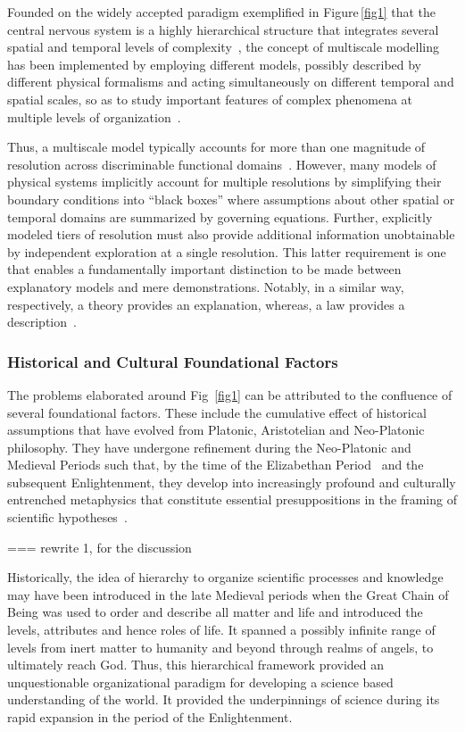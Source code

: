 \documentclass[10pt,letterpaper]{article}
\begin{document}
Founded on the widely accepted paradigm exemplified in Figure\,\ref{fig1} that the central nervous system is a highly hierarchical structure that integrates several spatial and temporal levels of complexity~\cite{bouteiller11}, the concept of multiscale modelling has been implemented by employing different models, possibly described by different physical formalisms and acting simultaneously on different temporal and spatial scales, so as to study important features of complex phenomena at multiple levels of organization~\cite{djurfeldt07}.

Thus, a multiscale model typically accounts for more than one magnitude of resolution across discriminable functional domains~\cite{walpole13}. However, many models of physical systems implicitly account for multiple resolutions by simplifying their boundary conditions into “black boxes” where assumptions about other spatial or temporal domains are summarized by governing equations. Further, explicitly modeled tiers of resolution must also provide additional information unobtainable by independent exploration at a single resolution. This latter requirement is one that enables a fundamentally important distinction to be made between explanatory models and mere demonstrations. Notably, in a similar way, respectively, a theory provides an explanation, whereas, a law provides a description~\cite{schurger22}.

\subsubsection*{Historical and Cultural Foundational Factors}

The problems elaborated around Fig~\ref{fig1} can be attributed to the confluence of several foundational factors. These include the cumulative effect of historical assumptions that have evolved from Platonic, Aristotelian and Neo-Platonic~\cite{parker99} philosophy. They have undergone refinement during the Neo-Platonic and Medieval Periods such that, by the time of the Elizabethan Period~\cite{tillyard17} and the subsequent Enlightenment, they develop into increasingly profound and culturally entrenched metaphysics that constitute essential presuppositions in the framing of scientific hypotheses~\cite{lovejoy48}.

=== rewrite 1, for the discussion

Historically, the idea of hierarchy to organize scientific processes and knowledge may have been introduced in the late Medieval periods when the Great Chain of Being was used to order and describe all matter and life and introduced the levels, attributes and hence roles of life.  It spanned a possibly infinite range of levels from inert matter to humanity and beyond through realms of angels, to ultimately reach God. Thus, this hierarchical framework provided an unquestionable organizational paradigm for developing a science based understanding of the world.  It provided the underpinnings of science during its rapid expansion in the period of the Enlightenment.
\end{document}
